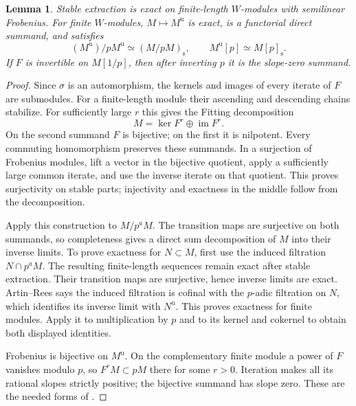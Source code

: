 \documentclass[11pt]{article}
\newtheorem{lemma}[theorem]{Lemma}
\theoremstyle{remark}\newtheorem{remark}[theorem]{Remark}
\newcommand{\st}{\mathrm{s}}
\newcommand{\uF}{\mathrm{u}}
\begin{document}
\begin{lemma}\label{lem:fitting}
Stable extraction is exact on finite-length $W$-modules with semilinear Frobenius. For finite $W$-modules, $M\mapsto M^{\uF}$ is exact, is a functorial direct summand, and satisfies
\[
 (M^{\uF})/pM^{\uF}\simeq(M/pM)_{\st},\qquad
 M^{\uF}[p]\simeq M[p]_{\st}.
\]
If $F$ is invertible on $M[1/p]$, then after inverting $p$ it is the slope-zero summand.
\end{lemma}
\begin{proof}
Since $\sigma$ is an automorphism, the kernels and images of every iterate of $F$ are submodules. For a finite-length module their ascending and descending chains stabilize. For sufficiently large $r$ this gives the Fitting decomposition
\[
 M=\ker F^r\oplus\operatorname{im}F^r.
\]
On the second summand $F$ is bijective; on the first it is nilpotent. Every commuting homomorphism preserves these summands. In a surjection of Frobenius modules, lift a vector in the bijective quotient, apply a sufficiently large common iterate, and use the inverse iterate on that quotient. This proves surjectivity on stable parts; injectivity and exactness in the middle follow from the decomposition.

Apply this construction to $M/p^aM$. The transition maps are surjective on both summands, so completeness gives a direct sum decomposition of $M$ into their inverse limits. To prove exactness for $N\subset M$, first use the induced filtration $N\cap p^aM$. The resulting finite-length sequences remain exact after stable extraction. Their transition maps are surjective, hence inverse limits are exact. Artin--Rees says the induced filtration is cofinal with the $p$-adic filtration on $N$, which identifies its inverse limit with $N^{\uF}$. This proves exactness for finite modules. Apply it to multiplication by $p$ and to its kernel and cokernel to obtain both displayed identities.

Frobenius is bijective on $M^{\uF}$. On the complementary finite module a power of $F$ vanishes modulo $p$, so $F^rM\subset pM$ there for some $r>0$. Iteration makes all its rational slopes strictly positive; the bijective summand has slope zero. These are the needed forms of \citet[Lemma~4.8 and Remark~4.10]{Ogus}.
\end{proof}
\end{document}

